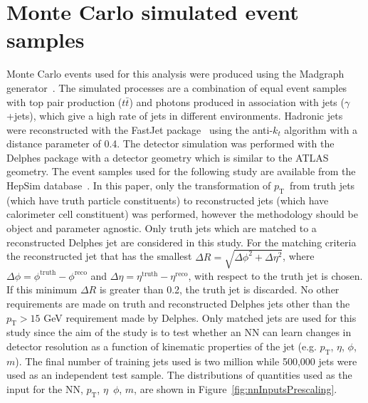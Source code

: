 \documentclass[showpacs,showkeys,preprint,prd,nofootinbib,linenumbers,12pt,superscriptaddress]{revtex4-1}
\def\pt{\ensuremath{p_{\mathrm{T}}}}
\begin{document}
\section{Monte Carlo simulated event samples}
\FloatBarrier
Monte Carlo events used for this analysis were produced using the Madgraph generator~\cite{Alwall:2014hca}. The simulated processes are a combination of equal event samples with  top pair production ($t\bar{t}$) and photons produced in association with jets ($\gamma$+jets), which give a high rate of jets in different environments. 
Hadronic jets were reconstructed with the {\sc FastJet} package~\cite{Fastjet} using the anti-$k_t$ algorithm \cite{Cacciari:2008gp} with a distance parameter of 0.4. The detector simulation was performed with the Delphes package with a detector geometry which is similar to the ATLAS geometry. 
The event samples used for the following study are available from the HepSim database~\cite{Chekanov:2014fga}. In this paper, only the transformation of \pt\ from truth jets (which have truth particle constituents) to reconstructed jets (which have calorimeter cell constituent) was performed, however the methodology should be object and parameter agnostic. Only truth jets which are matched to a reconstructed Delphes jet are considered in this study. For the matching criteria the reconstructed jet that has the smallest $\Delta R=\sqrt{\Delta\phi^2+\Delta\eta^2}$, where $\Delta\phi=\phi^{\text{truth}}-\phi^{\text{reco}}$ and $\Delta\eta=\eta^{\text{truth}}-\eta^{\text{reco}}$, with respect to the truth jet is chosen. If this minimum $\Delta R$ is greater than 0.2, the truth jet is discarded. No other requirements are made on truth and reconstructed Delphes jets other than the $\pt>15$ GeV requirement made by Delphes. Only matched jets are used for this study since the aim of the study is to test whether an NN can learn changes in detector resolution as a function of kinematic properties of the jet (e.g. $\pt$, $\eta$, $\phi$, $m$). 
The final number of training jets used is two million while 500,000 jets were used as an independent test sample. The distributions of quantities used as the input for the NN, \pt, $\eta$\, $\phi$, $m$, are shown in Figure~\ref{fig:nnInputsPrescaling}.
\end{document}
